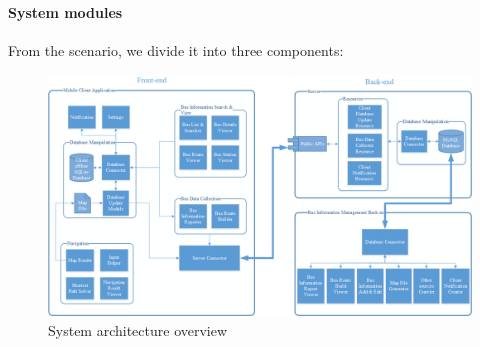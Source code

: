 		\paragraph{System modules}	
			From the scenario, we divide it into three components:
			\newpage
			\begin{landscape}
			\begin{figure}[H]
				\centering
				\includegraphics[scale=4.0]{Chapters/Fig/System-architecture-overview-details.png}
				\caption{System architecture overview}
				\label{fig:system-architecture-overview}
			\end{figure}
			\end{landscape}
			\newpage
		
